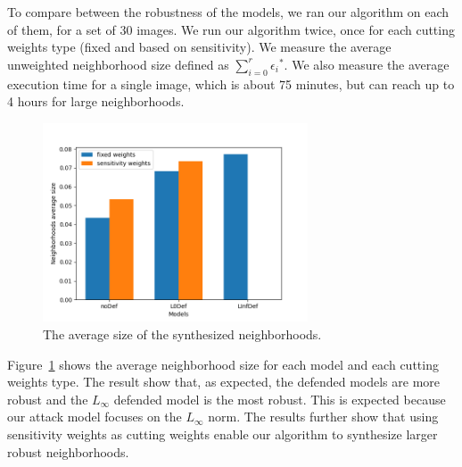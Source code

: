 To compare between the robustness of the models, we ran our algorithm on each of them, for a set of 30 images.
We run our algorithm twice, once for each cutting weights type (fixed and based on sensitivity).
We measure the average unweighted neighborhood size defined as $\sum_{i=0}^{r}{{\epsilon_i}^*}$.
We also measure the average execution time for a single image, which is about 75 minutes, but can reach up to 4 hours for large neighborhoods.
\begin{figure}
    \centering
    \includegraphics[width=0.7\textwidth]{neighborhoods_average_size.png}
    \caption{The average size of the synthesized neighborhoods.}
    \label{fig:neighborhoods_average_size}
\end{figure}
Figure~\ref{fig:neighborhoods_average_size} shows the average neighborhood size for each model and each cutting weights type.
The result show that, as expected, the defended models are more robust and the $L_{\infty}$ defended model is the most robust.
This is expected because our attack model focuses on the $L_{\infty}$ norm.
 The results further show that using sensitivity weights as cutting weights enable our algorithm to synthesize larger robust neighborhoods.
%


